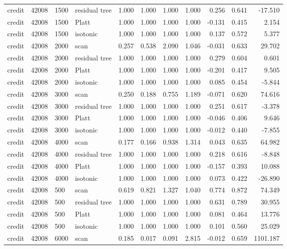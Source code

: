 \begin{tabular}{lrllrrrrrrr}
credit & 42008 & 1500 & residual tree & 1.000 & 1.000 & 1.000 & 1.000 & 0.256 & 0.641 & -17.510 \\
credit & 42008 & 1500 & Platt & 1.000 & 1.000 & 1.000 & 1.000 & -0.131 & 0.415 & 2.154 \\
credit & 42008 & 1500 & isotonic & 1.000 & 1.000 & 1.000 & 1.000 & 0.137 & 0.572 & 5.377 \\
credit & 42008 & 2000 & scan & 0.257 & 0.538 & 2.090 & 1.046 & -0.031 & 0.633 & 29.702 \\
credit & 42008 & 2000 & residual tree & 1.000 & 1.000 & 1.000 & 1.000 & 0.279 & 0.604 & 0.601 \\
credit & 42008 & 2000 & Platt & 1.000 & 1.000 & 1.000 & 1.000 & -0.201 & 0.417 & 9.505 \\
credit & 42008 & 2000 & isotonic & 1.000 & 1.000 & 1.000 & 1.000 & 0.085 & 0.454 & -5.844 \\
credit & 42008 & 3000 & scan & 0.250 & 0.188 & 0.755 & 1.189 & -0.071 & 0.620 & 74.616 \\
credit & 42008 & 3000 & residual tree & 1.000 & 1.000 & 1.000 & 1.000 & 0.251 & 0.617 & -3.378 \\
credit & 42008 & 3000 & Platt & 1.000 & 1.000 & 1.000 & 1.000 & -0.046 & 0.406 & 9.646 \\
credit & 42008 & 3000 & isotonic & 1.000 & 1.000 & 1.000 & 1.000 & -0.012 & 0.440 & -7.855 \\
credit & 42008 & 4000 & scan & 0.177 & 0.166 & 0.938 & 1.314 & 0.043 & 0.635 & 64.982 \\
credit & 42008 & 4000 & residual tree & 1.000 & 1.000 & 1.000 & 1.000 & 0.218 & 0.616 & -8.848 \\
credit & 42008 & 4000 & Platt & 1.000 & 1.000 & 1.000 & 1.000 & -0.157 & 0.393 & 10.088 \\
credit & 42008 & 4000 & isotonic & 1.000 & 1.000 & 1.000 & 1.000 & 0.073 & 0.422 & -26.890 \\
credit & 42008 & 500 & scan & 0.619 & 0.821 & 1.327 & 1.040 & 0.774 & 0.872 & 74.349 \\
credit & 42008 & 500 & residual tree & 1.000 & 1.000 & 1.000 & 1.000 & 0.631 & 0.789 & 30.955 \\
credit & 42008 & 500 & Platt & 1.000 & 1.000 & 1.000 & 1.000 & 0.081 & 0.464 & 13.776 \\
credit & 42008 & 500 & isotonic & 1.000 & 1.000 & 1.000 & 1.000 & 0.101 & 0.560 & 25.029 \\
credit & 42008 & 6000 & scan & 0.185 & 0.017 & 0.091 & 2.815 & -0.012 & 0.659 & 1101.187 \\

\end{tabular}
